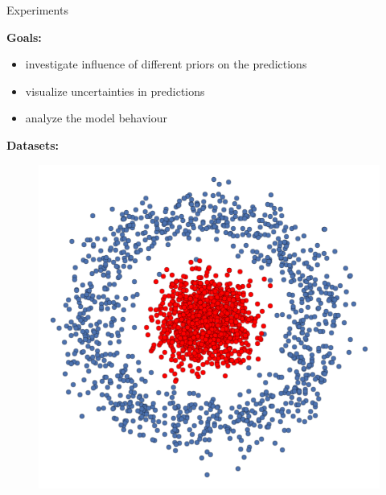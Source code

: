 \documentclass{beamer}
\begin{document}
\begin{frame}{Experiments}
	
	\textbf{Goals:}
	\begin{itemize}
		\item investigate influence of different priors on the predictions
		\item visualize uncertainties in predictions
		\item analyze the model behaviour
	\end{itemize}
	\vspace{0.3cm}
	\textbf{Datasets:}
	
	\begin{minipage}[t]{0.31\columnwidth}
		\begin{figure}
			\includegraphics[width=1\columnwidth]{pres_pics/circles_ex}
		\end{figure}
	\end{minipage}
	\begin{minipage}[t]{0.31\columnwidth}
		\begin{figure}

\end{figure}
\end{minipage}
\end{frame}
\end{document}
